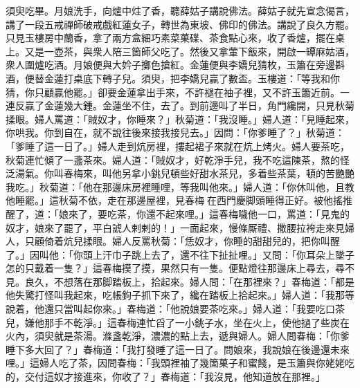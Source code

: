 須臾吃畢。月娘洗手，向爐中炷了香，聽薛姑子講說佛法。薛姑子就先宣念偈言，講了一段五戒禪師破戒戲紅蓮女子，轉世為東坡、佛印的佛法。講說了良久方罷。只見玉樓房中蘭香，拿了兩方盒細巧素菜菓碟、茶食點心來，收了香爐，擺在桌上。又是一壺茶，與衆人陪三箇師父吃了。然後又拿葷下飯來，開啟一罈麻姑酒，衆人圍爐吃酒。月娘便與大妗子擲色搶紅。金蓮便與李嬌兒猜枚，玉簫在旁邊斟酒，便替金蓮打桌底下轉子兒。須臾，把李嬌兒贏了數盃。{}玉樓道：「等我和你猜，你只顧贏他罷。」卻要金蓮拿出手來，不許褪在袖子裡，又不許玉簫近前。{}一連反贏了金蓮幾大鍾。金蓮坐不住，去了。到前邊叫了半日，角門纔開，只見秋菊揉眼。婦人罵道：「賊奴才，你睡來？」秋菊道：「我沒睡。」{}婦人道：「見睡起來，你哄我。你到自在，就不說往後來接我接兒去。」因問：「你爹睡了？」秋菊道：「爹睡了這一日了。」婦人走到炕房裡，摟起裙子來就在炕上烤火。婦人要茶吃，秋菊連忙傾了一盞茶來。婦人道：「賊奴才，好乾淨手兒，我不吃這陳茶，熬的怪泛湯氣。你叫春梅來，叫他另拿小銚兒頓些好甜水茶兒，多着些茶葉，頓的苦艷艷我吃。」秋菊道：「他在那邊床房裡睡哩，等我叫他來。」婦人道：「你休叫他，且教他睡罷。」{}這秋菊不依，走在那邊屋裡，見春梅𢱉在西門慶脚頭睡得正好。{}被他搖推醒了，道：「娘來了，要吃茶，你還不起來哩。」這春梅噦他一口，罵道：「見鬼的奴才，娘來了罷了，平白諕人剌剌的！」一面起來，慢條厮禮、撒腰拉袴走來見婦人，只顧倚着炕兒揉眼。婦人反罵秋菊：「恁奴才，你睡的甜甜兒的，把你叫醒了。」因叫他：「你頭上汗巾子跳上去了，還不往下扯扯哩。」又問：「你耳朵上墜子怎的只戴着一隻？」這春梅摸了摸，果然只有一隻。便點燈往那邊床上尋去，尋不見。良久，不想落在那脚踏板上，拾起來。婦人問：「在那裡來？」春梅道：「都是他失驚打怪叫我起來，吃帳鉤子抓下來了，纔在踏板上拾起來。」{}婦人道：「我那等說着，他還只當叫起你來。」春梅道：「他說娘要茶吃來。」婦人道：「我要吃口茶兒，嫌他那手不乾淨。」這春梅連忙舀了一小銚子水，坐在火上，使他撾了些炭在火內，須臾就是茶湯。滌盞乾淨，濃濃的點上去，遞與婦人。婦人問春梅：「你爹睡下多大回了？」春梅道：「我打發睡了這一日了。問娘來，我說娘在後邊還未來哩。」這婦人吃了茶，因問春梅：「我頭裡袖了幾箇菓子和蜜餞，是玉簫與你姥姥吃的，交付這奴才接進來，你收了？」春梅道：「我沒見，他知道放在那裡。」

